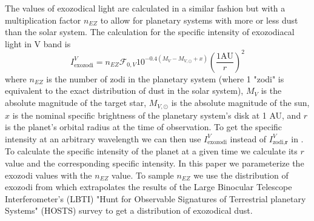 The values of exozodical light are calculated in a
similar fashion but with a multiplication factor $n_{EZ}$ to allow for
planetary systems with more or less dust than the solar system. The calculation
for the specific intensity of exozodiacal light in V band is
\begin{equation}
  I_\textrm{exozodi}^V = n_{EZ} \mathcal{F}_{0,V}10^{-0.4(M_V-M_{V,\odot}+x)}\left( \frac{1 \textrm{AU}}{r}\right)^2
  \label{eq:exozodi}
\end{equation}
where $n_{EZ}$ is the number of zodi in the planetary system (where 1 "zodi" is
equivalent to the exact distribution of dust in the solar system), $M_V$ is the
absolute magnitude of the target star, $M_{V,\odot}$ is the absolute magnitude
of the sun, $x$ is the nominal specific brightness of the planetary system's
disk at 1 AU, and $r$ is the planet's orbital radius at the time of
observation. To get the specific intensity at an arbitrary wavelength we can
then use $I_\textrm{exozodi}^V$ instead of $I_{\textrm{zodi}, \textbf{r}}^V$ in
. To calculate the specific intensity of the planet at a
given time we calculate its $r$ value and the corresponding specific intensity.
In this paper we parameterize the exozodi values with the $n_{EZ}$ value. To
sample $n_{EZ}$ we use the distribution of exozodi from
\citet{ertelHOSTSSurvey2020} which extrapolates the results of the Large
Binocular Telescope Interferometer's (LBTI) "Hunt for Observable Signatures of
Terrestrial planetary Systems" (HOSTS) survey to get a distribution of
exozodical dust.



